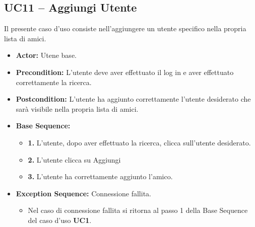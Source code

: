 \subsection{UC11 -- Aggiungi Utente}
Il presente caso d'uso consiste nell'aggiungere un utente specifico nella 
propria lista di amici.
\begin{itemize}
    \item \textbf{Actor:} Utene base.
    \item \textbf{Precondition:} L'utente deve aver effettuato il log in e aver effettuato correttamente la ricerca.
    \item \textbf{Postcondition:} L'utente ha aggiunto correttamente l'utente desiderato che sarà visibile nella propria lista di amici.
    \item \textbf{Base Sequence:}
    \begin{itemize}
        \item \textbf{1.} L'utente, dopo aver effettuato la ricerca, clicca sull'utente desiderato.
        \item \textbf{2.} L'utente clicca su Aggiungi
        \item \textbf{3.} L'utente ha correttamente aggiunto l'amico.
    \end{itemize}
    \item \textbf{Exception Sequence:} Connessione fallita.
    \begin{itemize}
        \item Nel caso di connessione fallita si ritorna al passo 1 della Base Sequence del caso d'uso \textbf{UC1}.
    \end{itemize}
\end{itemize}
\vspace{1cm}

